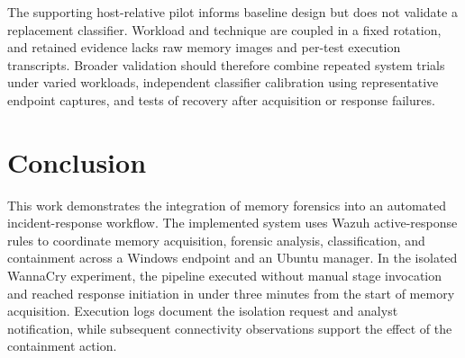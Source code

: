 \documentclass[conference]{IEEEtran}
\begin{document}
The supporting host-relative pilot informs baseline design but does not validate a replacement classifier. Workload and technique are coupled in a fixed rotation, and retained evidence lacks raw memory images and per-test execution transcripts. Broader validation should therefore combine repeated system trials under varied workloads, independent classifier calibration using representative endpoint captures, and tests of recovery after acquisition or response failures.


\section{Conclusion}

This work demonstrates the integration of memory forensics into an automated incident-response workflow. The implemented system uses Wazuh active-response rules to coordinate memory acquisition, forensic analysis, classification, and containment across a Windows endpoint and an Ubuntu manager. In the isolated WannaCry experiment, the pipeline executed without manual stage invocation and reached response initiation in under three minutes from the start of memory acquisition. Execution logs document the isolation request and analyst notification, while subsequent connectivity observations support the effect of the containment action.
\end{document}
